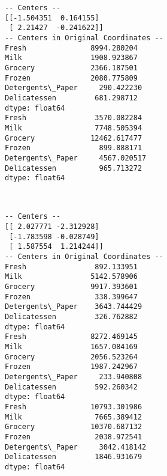 \documentclass{article}
\begin{document}
    \begin{Verbatim}[commandchars=\\\{\}]
-- Centers --
[[-1.504351  0.164155]
 [ 2.21427  -0.241622]]
-- Centers in Original Coordinates --
Fresh               8994.280204
Milk                1908.923867
Grocery             2366.187501
Frozen              2080.775809
Detergents\_Paper     290.422230
Delicatessen         681.298712
dtype: float64
Fresh                3570.082284
Milk                 7748.505394
Grocery             12462.617477
Frozen                899.888171
Detergents\_Paper     4567.020517
Delicatessen          965.713272
dtype: float64
    \end{Verbatim}

    \begin{center}
    \end{center}
    { \hspace*{\fill} \\}
    
    \begin{Verbatim}[commandchars=\\\{\}]
-- Centers --
[[ 2.027771 -2.312928]
 [-1.783598 -0.028749]
 [ 1.587554  1.214244]]
-- Centers in Original Coordinates --
Fresh                892.133951
Milk                5142.578906
Grocery             9917.393601
Frozen               338.399647
Detergents\_Paper    3643.744429
Delicatessen         326.762882
dtype: float64
Fresh               8272.469145
Milk                1657.084169
Grocery             2056.523264
Frozen              1987.242967
Detergents\_Paper     233.940808
Delicatessen         592.260342
dtype: float64
Fresh               10793.301986
Milk                 7665.389412
Grocery             10370.687132
Frozen               2038.972541
Detergents\_Paper     3042.418142
Delicatessen         1846.931679
dtype: float64
    \end{Verbatim}

    \begin{center}
    \end{center}
    { \hspace*{\fill} \\}
    
\end{document}
